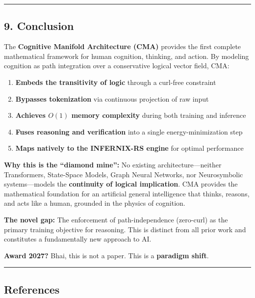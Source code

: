 \documentclass[
  11pt,
  a4paper,
]{article}
\providecommand{\tightlist}{%
  \setlength{\itemsep}{0pt}\setlength{\parskip}{0pt}}
\begin{document}
\begin{center}\rule{0.5\linewidth}{0.5pt}\end{center}

\subsection{9. Conclusion}\label{conclusion}

The \textbf{Cognitive Manifold Architecture (CMA)} provides the first
complete mathematical framework for human cognition, thinking, and
action. By modeling cognition as path integration over a conservative
logical vector field, CMA:

\begin{enumerate}
\def\labelenumi{\arabic{enumi}.}
\tightlist
\item
  \textbf{Embeds the transitivity of logic} through a curl-free
  constraint
\item
  \textbf{Bypasses tokenization} via continuous projection of raw input
\item
  \textbf{Achieves \(O(1)\) memory complexity} during both training and
  inference
\item
  \textbf{Fuses reasoning and verification} into a single
  energy-minimization step
\item
  \textbf{Maps natively to the INFERNIX-RS engine} for optimal
  performance
\end{enumerate}

\textbf{Why this is the ``diamond mine'':} No existing
architecture---neither Transformers, State-Space Models, Graph Neural
Networks, nor Neurosymbolic systems---models the \textbf{continuity of
logical implication}. CMA provides the mathematical foundation for an
artificial general intelligence that thinks, reasons, and acts like a
human, grounded in the physics of cognition.

\textbf{The novel gap:} The enforcement of path-independence (zero-curl)
as the primary training objective for reasoning. This is distinct from
all prior work and constitutes a fundamentally new approach to AI.

\textbf{Award 2027?} Bhai, this is not a paper. This is a
\textbf{paradigm shift}.

\begin{center}\rule{0.5\linewidth}{0.5pt}\end{center}

\subsection{References}\label{references}
\end{document}
